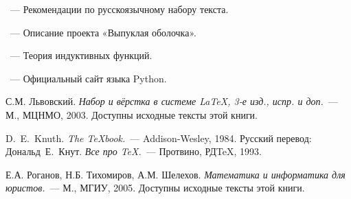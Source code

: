 \begin{thebibliography}{}

~---
Рекомендации по русскоязычному набору текста.

~---
Описание проекта «Выпуклая оболочка».

~---
Теория индуктивных функций.

~---
Официальный сайт языка Python.

С.М. Львовский.
{\em Набор и вёрстка в системе \LaTeX, 3-е изд., испр. и доп.}~---
М., МЦНМО, 2003. Доступны исходные тексты этой книги.

D.~E.~Knuth. {\em The \TeX{}book.}~---
Addison-Wesley, 1984. Русский перевод:
Дональд~Е.~Кнут.
{\em Все про \TeX.}~--- Протвино, РД\TeX, 1993.

Е.А. Роганов, Н.Б. Тихомиров, А.М. Шелехов.
{\em Математика и информатика для юристов.}~---
М., МГИУ, 2005.
Доступны исходные тексты этой книги.

\end{thebibliography}
